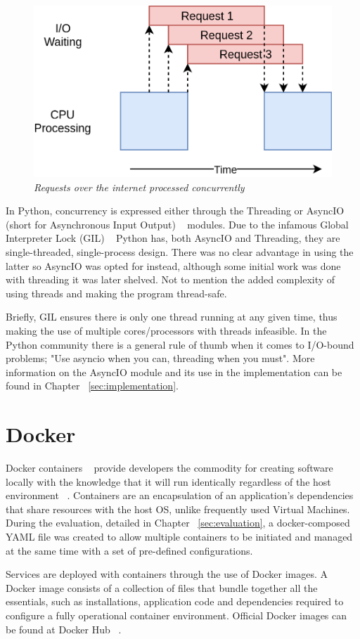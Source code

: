 \begin{figure}[ht]
 \centering
 \includegraphics[width=\linewidth]{figures/concurrency_example.png}
 \caption[Requests over the internet processed concurrently]{\textit{Requests over the internet processed concurrently} ~\cite{concurrency_realpython}}
 \label{fig:concurrency_example}
\end{figure}

In Python, concurrency is expressed either through the Threading or AsyncIO (short for Asynchronous Input Output) ~\cite{asyncio} modules. Due to the infamous Global Interpreter Lock (GIL) ~\cite{gil_realpython} Python has, both AsyncIO and Threading, they are single-threaded, single-process design. There was no clear advantage in using the latter so AsyncIO was opted for instead, although some initial work was done with threading it was later shelved. Not to mention the added complexity of using threads and making the program thread-safe. 

Briefly, GIL ensures there is only one thread running at any given time, thus making the use of multiple cores/processors with threads infeasible. In the Python community there is a general rule of thumb when it comes to I/O-bound problems; "Use asyncio when you can, threading when you must". More information on the AsyncIO module and its use in the \pname implementation can be found in Chapter ~\ref{sec:implementation}.

\section{Docker}
Docker containers ~\cite{docker_containers} provide developers the commodity for creating software locally with the knowledge that it will run identically regardless of the host environment ~\cite{using_docker_book}. Containers are an encapsulation of an application's dependencies that share resources with the host OS, unlike frequently used Virtual Machines. During the evaluation, detailed in Chapter ~\ref{sec:evaluation}, a docker-composed YAML file was created to allow multiple containers to be initiated and managed at the same time with a set of pre-defined configurations. 

Services are deployed with containers through the use of Docker images. A Docker image consists of a collection of files that bundle together all the essentials, such as installations, application code and dependencies required to configure a fully operational container environment. Official Docker images can be found at Docker Hub ~\cite{docker_hub}.